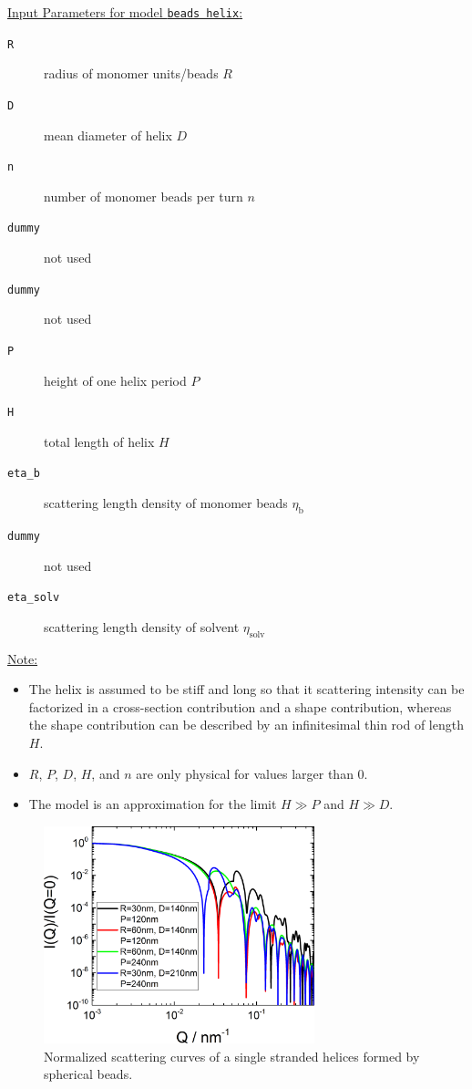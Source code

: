 \vspace{5mm}

\uline{Input Parameters for model \texttt{beads helix}:}\\
\begin{description}
\item[\texttt{R}] radius of monomer units/beads $R$
\item[\texttt{D}] mean diameter of helix $D$
\item[\texttt{n}] number of monomer beads per turn $n$
\item[\texttt{dummy}] not used
\item[\texttt{dummy}] not used
\item[\texttt{P}] height of one helix period $P$
\item[\texttt{H}] total length of helix $H$
\item[\texttt{eta\_b}] scattering length density of monomer beads $\eta_\text{b}$
\item[\texttt{dummy}] not used
\item[\texttt{eta\_solv}] scattering length density of solvent $\eta_\text{solv}$
\end{description}

\noindent\uline{Note:}
\begin{itemize}
\item The helix is assumed to be stiff and long so that it scattering intensity can be factorized in a cross-section contribution and a shape contribution, whereas the shape contribution can be described by an infinitesimal thin rod of length $H$.
\item $R$, $P$, $D$, $H$, and $n$ are only physical for values larger than 0.
\item The model is an approximation for the limit $H \gg P$ and $H \gg D$.
\end{itemize}

\begin{figure}[htb]
\begin{center}
\includegraphics[width=0.7\textwidth]{../images/form_factor/cylindrical_obj/helix_beadsIQ.png}
\end{center}
\caption{Normalized scattering curves of a single stranded helices formed by spherical beads.}
\label{fig:helixbeadsIQ}
\end{figure}


